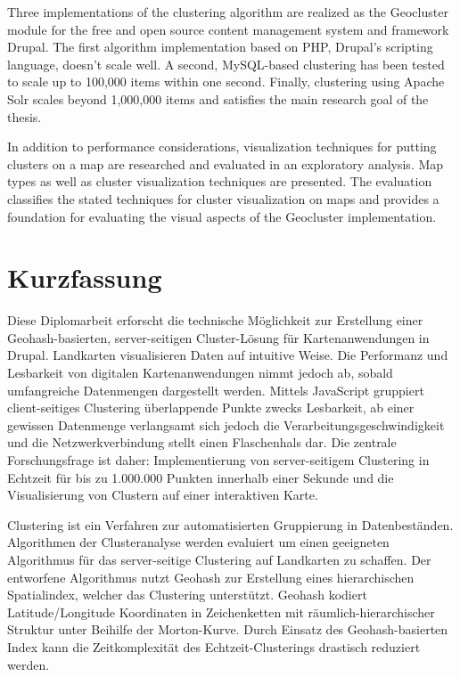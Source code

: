 Three implementations of the clustering algorithm are realized as the Geocluster module for the free and open source content management system and framework Drupal. The first algorithm implementation based on PHP, Drupal's scripting language, doesn't scale well. A second, MySQL-based clustering has been tested to scale up to 100,000 items within one second. Finally, clustering using Apache Solr scales beyond 1,000,000 items and satisfies the main research goal of the thesis.

In addition to performance considerations, visualization techniques for putting clusters on a map are researched and evaluated in an exploratory analysis. Map types as well as cluster visualization techniques are presented. The evaluation classifies the stated techniques for cluster visualization on maps and provides a foundation for evaluating the visual aspects of the Geocluster implementation.

\newpage

\chapter*{Kurzfassung}

Diese Diplomarbeit erforscht die technische M\"{o}glichkeit zur Erstellung einer Geohash-basierten, server-seitigen Cluster-L\"{o}sung f\"{u}r Kartenanwendungen in Drupal. Landkarten visualisieren Daten auf intuitive Weise. Die Performanz und Lesbarkeit von digitalen Kartenanwendungen nimmt jedoch ab, sobald umfangreiche Datenmengen dargestellt werden. Mittels JavaScript gruppiert client-seitiges Clustering \"{u}berlappende Punkte zwecks Lesbarkeit, ab einer gewissen Datenmenge verlangsamt sich jedoch die Verarbeitungsgeschwindigkeit und die Netzwerkverbindung stellt einen Flaschenhals dar. Die zentrale Forschungsfrage ist daher: Implementierung von server-seitigem Clustering in Echtzeit f\"{u}r bis zu 1.000.000 Punkten innerhalb einer Sekunde und die Visualisierung von Clustern auf einer interaktiven Karte.

Clustering ist ein Verfahren zur automatisierten Gruppierung in Datenbest\"{a}nden. Algorithmen der Clusteranalyse werden evaluiert um einen geeigneten Algorithmus f\"{u}r das server-seitige Clustering auf Landkarten zu schaffen. Der entworfene Algorithmus nutzt Geohash zur Erstellung eines hierarchischen Spatialindex, welcher das Clustering unterst\"{u}tzt. Geohash kodiert Latitude/Longitude Koordinaten in Zeichenketten mit r\"{a}umlich-hierarchischer Struktur unter Beihilfe der Morton-Kurve. Durch Einsatz des Geohash-basierten Index kann die Zeitkomplexit\"{a}t des Echtzeit-Clusterings drastisch reduziert werden.

